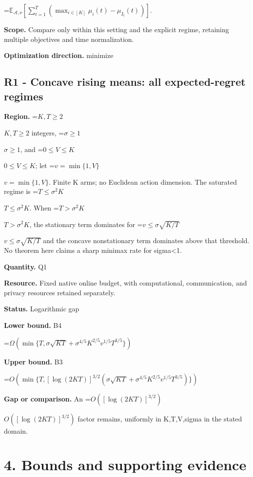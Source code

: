 \documentclass[10pt,a4paper]{article}
\newcommand{\AtlasMath}[1]{\par\begingroup\centering\setbox0=\hbox{$\displaystyle #1$}\ifdim\wd0>1.4\linewidth\typeout{ATLAS WIDE FORMULA: \the\wd0}\fi\ifdim\wd0>\linewidth\resizebox{\linewidth}{!}{\box0}\else\box0\fi\par\endgroup}
\newcommand{\AtlasInlineMath}[1]{\begingroup\setbox0=\hbox{$#1$}\ifdim\wd0>.4\linewidth\endgroup\AtlasMath{#1}\else\endgroup$#1$\fi}
\begin{document}
\AtlasMath{\mathbb E_{\mathcal A,\nu}\!\left[\sum_{t=1}^{T}\left(\max_{i\in[K]}\mu_i(t)-\mu_{I_t}(t)\right)\right].}


\textbf{Scope.} Compare only within this setting and the explicit regime, retaining multiple objectives and time normalization.



\textbf{Optimization direction.} minimize



\subsection{R1 - Concave rising means: all expected-regret regimes}


\textbf{Region.} \AtlasInlineMath{K,T\ge2} integers, \AtlasInlineMath{\sigma\ge1}, and \AtlasInlineMath{0\le V\le K}; let \AtlasInlineMath{v=\min\{1,V\}}. Finite K arms; no Euclidean action dimension. The saturated regime is \AtlasInlineMath{T\le\sigma^2K}. When \AtlasInlineMath{T>\sigma^2K}, the stationary term dominates for \AtlasInlineMath{v\le\sigma\sqrt{K/T}} and the concave nonstationary term dominates above that threshold. No theorem here claims a sharp minimax rate for sigma<1.



\textbf{Quantity.} Q1



\textbf{Resource.} Fixed native online budget, with computational, communication, and privacy resources retained separately.



\textbf{Status.} Logarithmic gap



\textbf{Lower bound.} B4



\AtlasMath{\Omega\!\left(\min\{T,\sigma\sqrt{KT}+\sigma^{4/5}K^{2/5}v^{1/5}T^{3/5}\}\right)}


\textbf{Upper bound.} B3



\AtlasMath{O\!\left(\min\{T,[\log(2KT)]^{3/2}(\sigma\sqrt{KT}+\sigma^{4/5}K^{2/5}v^{1/5}T^{3/5})\}\right)}


\textbf{Gap or comparison.} An \AtlasInlineMath{O([\log(2KT)]^{3/2})} factor remains, uniformly in K,T,V,sigma in the stated domain.



\section{4. Bounds and supporting evidence}
\end{document}
